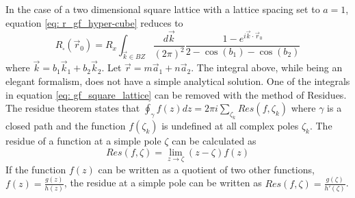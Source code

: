 In the case of a two dimensional square lattice with a lattice spacing set to $a=1$, equation \ref{eq: r_gf_hyper-cube} reduces to
\begin{equation}
R_{\square}(\vec{r}_0) = R_x \int_{\vec{k} \in BZ}\frac{d \vec{k}}{(2 \pi)^2}\frac{1 - e^{i \vec{k}\cdot \vec{r}_0}}{2 - \cos(b_1) - \cos(b_2)}
\label{eq: gf_square_lattice}
\end{equation}
where $\vec{k} = b_1\vec{k}_1 + b_2\vec{k}_2$. Let $\vec{r} = m \vec{a}_1 + n \vec{a}_2$. The integral above, while being an elegant formalism, does not have a simple analytical solution. One of the integrals in equation \ref{eq: gf_square_lattice} can be removed with the method of Residues\cite{cserti2000,berg2014}. The residue theorem states that $\oint_\gamma f(z) dz = 2 \pi i \sum_{\zeta_k} Res(f, \zeta_k)$ where $\gamma$ is a closed path and the function $f(\zeta_k)$ is undefined at all complex poles $\zeta_k$. The residue of a function at a simple pole $\zeta$ can be calculated as
\begin{equation}
Res(f,\zeta) = \lim_{z \rightarrow \zeta} (z - \zeta) f(z)
\end{equation}
If the function $f(z)$ can be written as a quotient of two other functions, $f(z) = \frac{g(z)}{h(z)}$, the residue at a simple pole can be written as\cite{berg2014} $Res(f,\zeta) = \frac{g(\zeta)}{h'(\zeta)}$.

